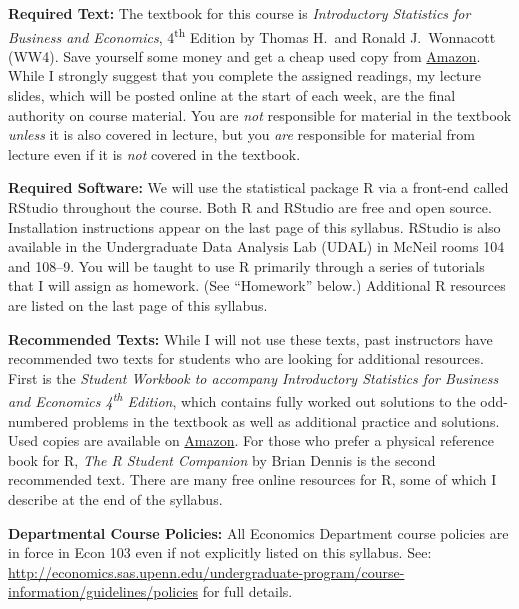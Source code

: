 \documentclass[11pt, letterpaper]{article}
\begin{document}
\medskip

\noindent \textbf{Required Text:} 
The textbook for this course is \emph{Introductory Statistics for Business and Economics}, 4\textsuperscript{th} Edition by Thomas H.\ and Ronald J.\ Wonnacott (WW4). 
Save yourself some money and get a cheap used copy from \href{http://tinyurl.com/ECON103-2013A}{Amazon}.
While I strongly suggest that you complete the assigned readings, my lecture slides, which will be posted online at the start of each week, are the final authority on course material. 
You are \emph{not} responsible for material in the textbook \emph{unless} it is also covered in lecture, but you \emph{are} responsible for material from lecture even if it is \emph{not} covered in the textbook.

\medskip

\noindent \textbf{Required Software:} 
We will use the statistical package R via a front-end called RStudio throughout the course. 
Both R and RStudio are free and open source. Installation instructions appear on the last page of this syllabus.
RStudio is also available in the Undergraduate Data Analysis Lab (UDAL) in McNeil rooms 104 and 108--9. 
You will be taught to use R primarily through a series of tutorials that I will assign as homework. (See ``Homework'' below.)  
Additional R resources are listed on the last page of this syllabus.

\medskip

\noindent \textbf{Recommended Texts:} 
While I will not use these texts, past instructors have recommended two texts for students who are looking for additional resources. 
First is the \emph{Student Workbook to accompany Introductory Statistics for Business and Economics 4\textsuperscript{th} Edition}, which contains fully worked out solutions to the odd-numbered problems in the textbook as well as additional practice and solutions. 
Used copies are available on \href{http://www.amazon.com/gp/offer-listing/0471508993/sr=/qid=/ref=olp_page_2?ie=UTF8&colid=&coliid=&condition=all&me=&qid=&shipPromoFilter=0&sort=sip&sr=&startIndex=10}{Amazon}. 
For those who prefer a physical reference book for R, \emph{The R Student Companion} by Brian Dennis is the second recommended text. 
There are many free online resources for R, some of which I describe at the end of the syllabus.

\newpage

\noindent \textbf{Departmental Course Policies: } 
All Economics Department course policies are in force in Econ 103 even if not explicitly listed on this syllabus. 
See: \url{http://economics.sas.upenn.edu/undergraduate-program/course-information/guidelines/policies} for full details. 
\end{document}
